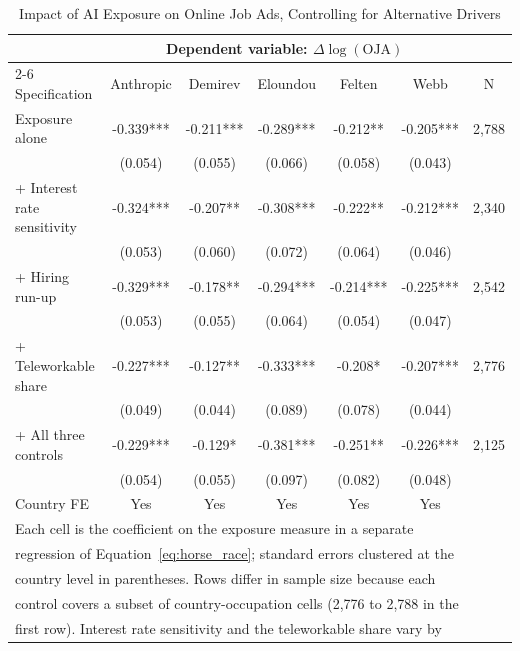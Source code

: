 \documentclass[11pt]{article}
\begin{document}
\begin{table}[htbp]
\centering
\footnotesize
\setlength{\tabcolsep}{4pt}
\caption{Impact of AI Exposure on Online Job Ads, Controlling for Alternative Drivers}
\begin{tabular}{lcccccc}
\hline\hline
 & \multicolumn{5}{c}{Dependent variable: $\Delta \log(\text{OJA})$} & \\
\cmidrule(lr){2-6}
Specification & Anthropic & Demirev & Eloundou & Felten & Webb & N \\
\midrule
Exposure alone & -0.339*** & -0.211*** & -0.289*** & -0.212** & -0.205*** & 2,788 \\
 & (0.054) & (0.055) & (0.066) & (0.058) & (0.043) & \\
+ Interest rate sensitivity & -0.324*** & -0.207** & -0.308*** & -0.222** & -0.212*** & 2,340 \\
 & (0.053) & (0.060) & (0.072) & (0.064) & (0.046) & \\
+ Hiring run-up & -0.329*** & -0.178** & -0.294*** & -0.214*** & -0.225*** & 2,542 \\
 & (0.053) & (0.055) & (0.064) & (0.054) & (0.047) & \\
+ Teleworkable share & -0.227*** & -0.127** & -0.333*** & -0.208* & -0.207*** & 2,776 \\
 & (0.049) & (0.044) & (0.089) & (0.078) & (0.044) & \\
+ All three controls & -0.229*** & -0.129* & -0.381*** & -0.251** & -0.226*** & 2,125 \\
 & (0.054) & (0.055) & (0.097) & (0.082) & (0.048) & \\
\midrule
Country FE & Yes & Yes & Yes & Yes & Yes & \\
\hline\hline
\multicolumn{7}{l}{\footnotesize Each cell is the coefficient on the exposure measure in a separate} \\
\multicolumn{7}{l}{\footnotesize regression of Equation~\ref{eq:horse_race}; standard errors clustered at the} \\
\multicolumn{7}{l}{\footnotesize country level in parentheses. Rows differ in sample size because each} \\
\multicolumn{7}{l}{\footnotesize control covers a subset of country-occupation cells (2,776 to 2,788 in the} \\
\multicolumn{7}{l}{\footnotesize first row). Interest rate sensitivity and the teleworkable share vary by} \\

\end{tabular}
\end{table}
\end{document}
